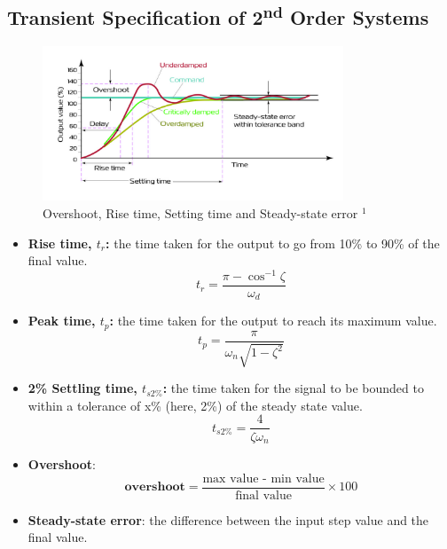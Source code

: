 \subsection{Transient Specification of 2\textsuperscript{nd} Order Systems}
\begin{figure}[H] 
    \centering
    \includegraphics[width=0.8\textwidth]{images/PID_response.jpg}
    \caption{Overshoot, Rise time, Setting time and Steady-state error $^{1}$}
\end{figure}

\begin{itemize}
    \item \textbf{Rise time, $t_{r}$:} the time taken for the output to go from 10\% to 90\% of the final value.
    \[t_{r} = \frac{\pi-\cos^{-1}\zeta}{\omega_{d}}\]
    
    \item \textbf{Peak time, $t_{p}$:} the time taken for the output to reach its maximum value.
    \[t_{p} = \frac{\pi}{\omega_{n}\sqrt{1-\zeta^{2}}}\]
    
    \item \textbf{2\% Settling time, $t_{s2\%}$:} the time taken for the signal to be bounded to within a tolerance of x\% (here, 2\%) of the steady state value.
    \[t_{s2\%} = \frac{4}{\zeta\omega_{n}}\]
    
    \item \textbf{Overshoot}: 
    \[\textbf{overshoot} = \frac{\text{max value - min value}}{\text{final value}}\times 100\]
    
    \item \textbf{Steady-state error}: the difference between the input step value and the final value.
\end{itemize}

